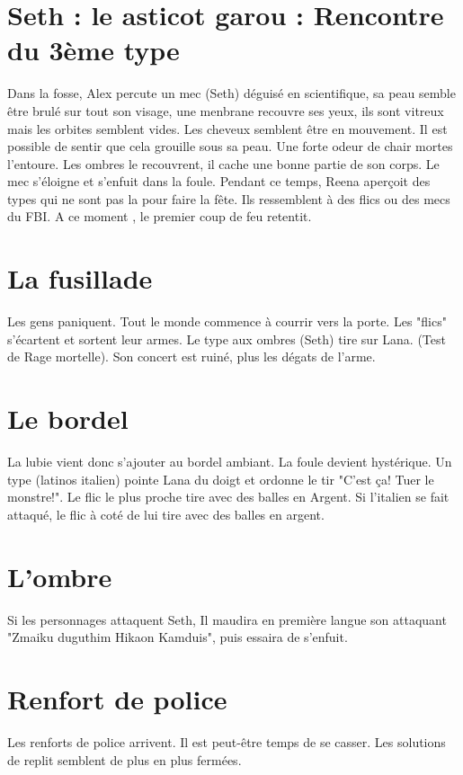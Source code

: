 \documentclass[oneside,12pt]{book}
\begin{document}
\begin{flushleft}
\section{Seth : le asticot garou : Rencontre du 3ème type}
Dans la fosse, Alex percute un mec (Seth) déguisé en scientifique, sa peau semble être brulé sur tout son visage, une menbrane recouvre ses yeux, ils sont vitreux mais les orbites semblent 
vides. 
Les cheveux semblent être en mouvement. Il est possible de sentir que cela grouille sous sa peau. Une forte odeur de chair mortes l'entoure. Les ombres le recouvrent, il cache une bonne partie 
de son corps.
Le mec s'éloigne et s'enfuit dans la foule. Pendant ce temps, Reena aperçoit des types qui ne sont pas la pour faire la fête. Ils 
ressemblent à des flics ou des mecs du FBI. A ce moment , le premier coup de feu retentit. 

\section{La fusillade}
Les gens paniquent. Tout le monde commence à courrir vers la porte. Les "flics" s'écartent et sortent leur armes. Le type aux ombres (Seth) tire sur Lana. (Test de Rage mortelle). Son concert 
est ruiné, plus les dégats de l'arme. 


\section{Le bordel}
La lubie vient donc s'ajouter au bordel ambiant. La foule devient hystérique.
Un type (latinos italien) pointe Lana du doigt et ordonne le tir "C'est ça! Tuer le monstre!". Le flic le plus proche tire avec des balles en Argent. Si l'italien se fait attaqué, le flic à 
coté de lui tire avec des balles en argent.
 
\section{L'ombre}
Si les personnages attaquent Seth, Il maudira en première langue son attaquant "Zmaiku duguthim Hikaon Kamduis", puis essaira de 
s'enfuit.  


\section{Renfort de police}
Les renforts de police arrivent. Il est peut-être temps de se casser. Les solutions de replit semblent de plus en plus fermées. 


\end{flushleft}
\end{document}
